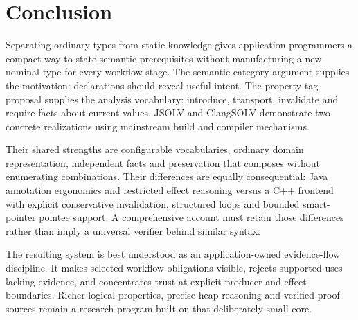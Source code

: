 \documentclass[11pt]{article}
\begin{document}
\section{Conclusion}
Separating ordinary types from static knowledge gives application programmers
a compact way to state semantic prerequisites without manufacturing a new
nominal type for every workflow stage. The semantic-category argument supplies
the motivation: declarations should reveal useful intent. The property-tag
proposal supplies the analysis vocabulary: introduce, transport, invalidate
and require facts about current values. JSOLV and ClangSOLV demonstrate two
concrete realizations using mainstream build and compiler mechanisms.

Their shared strengths are configurable vocabularies, ordinary domain
representation, independent facts and preservation that composes without
enumerating combinations. Their differences are equally consequential:
Java annotation ergonomics and restricted effect reasoning versus a C++
frontend with explicit conservative invalidation, structured loops and bounded
smart-pointer pointee support. A comprehensive account must retain those
differences rather than imply a universal verifier behind similar syntax.

The resulting system is best understood as an application-owned evidence-flow
discipline. It makes selected workflow obligations visible, rejects supported
uses lacking evidence, and concentrates trust at explicit producer and effect
boundaries. Richer logical properties, precise heap reasoning and verified
proof sources remain a research program built on that deliberately small core.

\appendix
\end{document}
